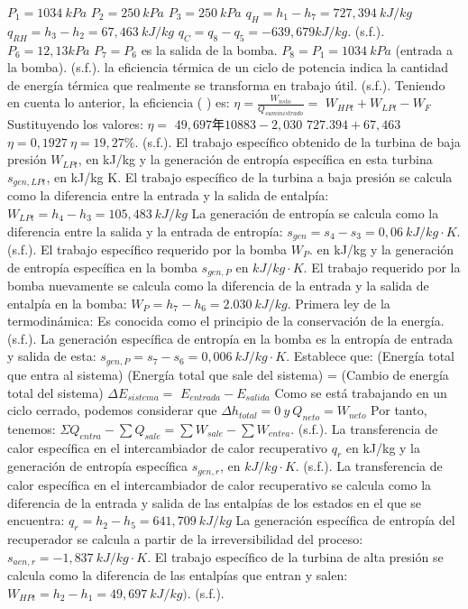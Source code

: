 \documentclass{beamer}
\begin{document}
\begin{frame}
\begin{thebibliography}{9}
         $P_{1}=1034~kPa$ $P_{2}=250~kPa$ $P_{3}=250~kPa$ $q_{H}=h_{1}-h_{7}=727,394~kJ/kg$ $q_{RH}=h_{3}-h_{2}=67,463~kJ/kg$ $q_{C}=q_{8}-q_{5}=-639,679kJ/kg$. (s.f.). 
         $P_{6}=12,13kPa$ $P_{7}=P_{6}$ es la salida de la bomba. $P_{8}=P_{1}=1034~kPa$ (entrada a la bomba). (s.f.). 
         la eficiencia térmica de un ciclo de potencia indica la cantidad de energía térmica que realmente se transforma en trabajo útil. (s.f.). 
         Teniendo en cuenta lo anterior, la eficiencia ( ) es: $\eta=\frac{W_{nsto}}{Q_{suministrado}}=$ $W_{HPt}+W_{LPt}-W_{F}$ Sustituyendo los valores: $\eta=$ $49,697年10883-2,030$ $727.394+67,463$ $\eta=0,1927~\eta=19,27\%$. (s.f.). 
         El trabajo específico obtenido de la turbina de baja presión $W_{LPt}$, en kJ/kg y la generación de entropía específica en esta turbina $s_{gen,LPt}$, en kJ/kg K. El trabajo específico de la turbina a baja presión se calcula como la diferencia entre la entrada y la salida de entalpía: $W_{LPt}=h_{4}-h_{3}=105,483~kJ/kg$ La generación de entropía se calcula como la diferencia entre la salida y la entrada de entropía: $s_{gen}=s_{4}-s_{3}=0,06~kJ/kg\cdot K$. (s.f.). 
         El trabajo específico requerido por la bomba $W_{P}$. en kJ/kg y la generación de entropía específica en la bomba $s_{gen,P}$ en $kJ/kg\cdot K.$ El trabajo requerido por la bomba nuevamente se calcula como la diferencia de la entrada y la salida de entalpía en la bomba: $W_{P}=h_{7}-h_{6}=2.030~kJ/kg$. Primera ley de la termodinámica: Es conocida como el principio de la conservación de la energía. (s.f.). 
         La generación específica de entropía en la bomba es la entropía de entrada y salida de esta: $s_{gen,P}=s_{7}-s_{6}=0,006~kJ/kg\cdot K$. Establece que: (Energía total que entra al sistema) (Energía total que sale del sistema) = (Cambio de energía total del sistema) $\Delta E_{sistema}=$ $E_{entrada}-E_{salida}$ Como se está trabajando en un ciclo cerrado, podemos considerar que $\Delta h_{total}=0~y~Q_{neto}=W_{neto}$ Por tanto, tenemos: $\Sigma Q_{entra}-\sum Q_{sale}=\sum W_{sale}-\sum W_{entra}$. (s.f.). 
         La transferencia de calor específica en el intercambiador de calor recuperativo $q_{r}$ en kJ/kg y la generación de entropía específica $s_{gen,r}$, en $kJ/kg\cdot K$. (s.f.). 
         La transferencia de calor específica en el intercambiador de calor recuperativo se calcula como la diferencia de la entrada y salida de las entalpías de los estados en el que se encuentra: $q_{r}=h_{2}-h_{5}=641,709~kJ/kg$ La generación específica de entropía del recuperador se calcula a partir de la irreversibilidad del proceso: $s_{aen,r}=-1,837~kJ/kg\cdot K$. El trabajo específico de la turbina de alta presión se calcula como la diferencia de las entalpías que entran y salen: $W_{HPt}=h_{2}-h_{1}=49,697~kJ/kg)$. (s.f.). 

\end{thebibliography}
\end{frame}
\end{document}
